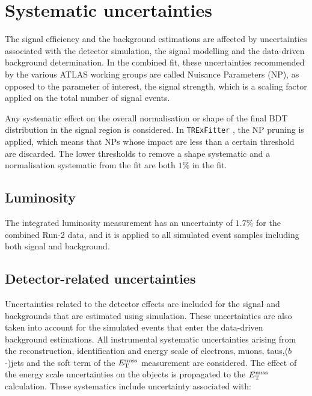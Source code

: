 \section{Systematic uncertainties}
\label{sec:systematics}
The signal efficiency and the background estimations are affected by uncertainties associated with the detector simulation, the signal modelling and the data-driven background determination. In the combined fit, these uncertainties recommended by the various ATLAS working groups are called Nuisance Parameters (NP), as opposed to the parameter of interest, the signal strength, which is a scaling factor applied on the total number of signal events.

Any systematic effect on the  overall normalisation or shape of the final BDT distribution in the signal region is considered. In \texttt{TRExFitter} \cite{TRExFitter}, the NP pruning is applied, which means that NPs whose impact are less than a certain threshold are discarded. The lower thresholds to remove a shape systematic and a normalisation systematic from the fit are both $1\%$ in the fit.

%

\subsection{Luminosity}
\label{sec:systematic_Luminosity}
The integrated luminosity measurement has an uncertainty of $1.7\%$ for the combined Run-2 data, and it is applied to all simulated event samples including both signal and background.

\subsection{Detector-related uncertainties}
\label{sec:syst_det}

Uncertainties related to the detector effects are included for the signal and backgrounds that are estimated using simulation. These uncertainties are also taken into account for the simulated events that enter the data-driven background estimations. All instrumental systematic uncertainties arising from the reconstruction, identification and energy scale of electrons, muons, taus,($b$-)jets and the soft term of the $E_{\text{T}}^{\text{miss}}$ measurement are considered. The effect of the energy scale uncertainties on the objects is propagated to the $E_{\text{T}}^{\text{miss}}$ calculation. These systematics include uncertainty associated with:

